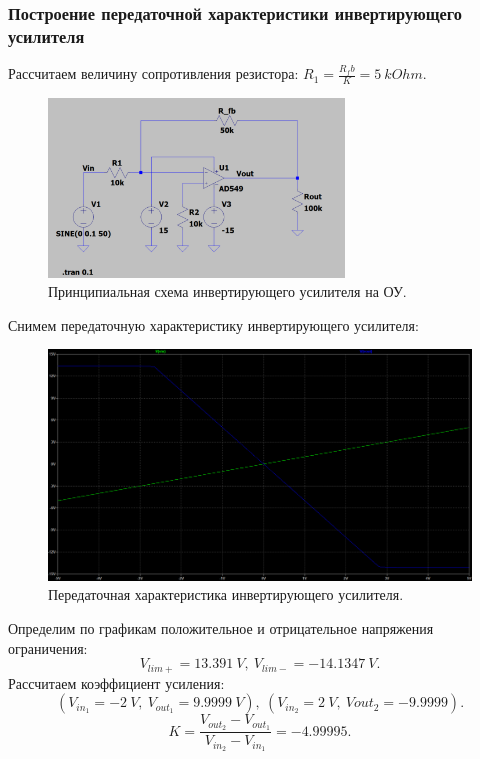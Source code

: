 \documentclass[12pt]{article}
\begin{document}
\subsubsection*{Построение передаточной характеристики инвертирующего усилителя}
Рассчитаем величину сопротивления резистора: $R_1 = \frac{R_fb}{K} = 5 \ kOhm.$
\begin{figure}[H]
    \centering
    \includegraphics[width=0.7\textwidth]{1_scheme.png}
    \caption{Принципиальная схема инвертирующего усилителя на ОУ.}
    \label{fig:1_scheme}
\end{figure}

Снимем передаточную характеристику инвертирующего усилителя:
\begin{figure}[H]
    \centering
    \includegraphics[width=\textwidth]{1_in_out.png}
    \caption{Передаточная характеристика инвертирующего усилителя.}
    \label{fig:1_in_out}
\end{figure}

Определим по графикам положительное и отрицательное напряжения ограничения:
\[
    V_{lim+} = 13.391 \ V, \ V_{lim-} = -14.1347 \ V.
\]
Рассчитаем коэффициент усиления:
\[
    (V_{in_1} = -2 \ V, \ V_{out_1} = 9.9999 \ V), \ (V_{in_2} = 2 \ V, \ V{out_2} = -9.9999).
\]
\[
    K = \frac{V_{out_2} - V_{out_1}}{V_{in_2} - V_{in_1}} = -4.99995.
\]
\end{document}
